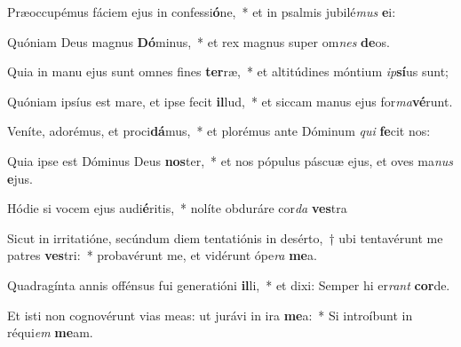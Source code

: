 \item Præoccupémus fáciem ejus in confessi\textbf{ó}ne,~* et in psalmis jubilé\textit{mus} \textbf{e}i:
\item Quóniam Deus magnus \textbf{Dó}minus,~* et rex magnus super om\textit{nes} \textbf{de}os.
\item Quia in manu ejus sunt omnes fines \textbf{ter}ræ,~* et altitúdines móntium \textit{ip}\textbf{sí}us sunt;
\item Quóniam ipsíus est mare, et ipse fecit \textbf{il}lud,~* et siccam manus ejus for\textit{ma}\textbf{vé}runt.
\item Veníte, adorémus, et proci\textbf{dá}mus,~* et plorémus ante Dóminum \textit{qui} \textbf{fe}cit nos:
\item Quia ipse est Dóminus Deus \textbf{nos}ter,~* et nos pópulus páscuæ ejus, et oves ma\textit{nus} \textbf{e}jus.
\item Hódie si vocem ejus audi\textbf{é}ritis,~* nolíte obduráre cor\textit{da} \textbf{ves}tra
\item Sicut in irritatióne, secúndum diem tentatiónis in desérto,~† ubi tentavérunt me patres \textbf{ves}tri:~* probavérunt me, et vidérunt ópe\textit{ra} \textbf{me}a.
\item Quadragínta annis offénsus fui generatióni \textbf{il}li,~* et dixi: Semper hi er\textit{rant} \textbf{cor}de.
\item Et isti non cognovérunt vias meas: ut jurávi in ira \textbf{me}a:~* Si introíbunt in réqui\textit{em} \textbf{me}am.
